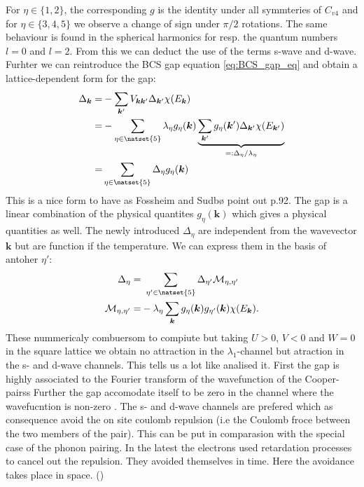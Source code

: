 \documentclass[../main.tex]{subfile}
\begin{document}
For $\eta \in \{1,2\}$, the corresponding $g$ is the identity under all symmteries of $C_{v4}$ and for $\eta \in \{3,4,5\}$ we observe a change of sign under  $\pi/2$ rotations.
The same behaviour is found in the spherical harmonics for resp. the quantum numbers $l=0$ and $l=2$. From this we can deduct the use of the terms s-wave and d-wave. \\ 

Furhter we can reintroduce the BCS gap equation \ref{eq:BCS_gap_eq} and obtain a lattice-dependent form for the gap:
\begin{equation}
    \begin{aligned}
    \Delta_{\bm{k}} =& -\sum_{\bm{k}'} V_{\bm{k}\bm{k}'}\Delta_{\bm{k}'}\chi(E_{\bm{k}})\\
    =& -\sum_{\eta\in\natset{5}} \lambda_{\eta} g_{\eta}(\bm{k}) \underbrace{\sum_{\bm{k}'} g_{\eta}(\bm{k}') \Delta_{\bm{k}'}\chi(E_{\bm{k}'})}_{=: \Delta_{\eta}/\lambda_{\eta}}\\
    =& \sum_{\eta\in\natset{5}}\Delta_{\eta} g_{\eta}(\bm{k})
    \end{aligned}
\end{equation}
This is a nice form to have as Fossheim and Sudbø \cite{FossheimSudbo2004} point out p.92. The gap is a linear combination of the physical quantites $g_{\eta}(\bm{k})$ which gives a physical 
quantities as well. The newly introduced $\Delta_{\eta}$ are independent from the wavevector $\bm{k}$ but are function if the temperature. We can express them in the basis 
of antoher $\eta'$:
\begin{align*}
    \Delta_{\eta} = &~\sum_{\eta' \in \natset{5}} \Delta_{\eta'} \mathcal{M}_{\eta,\eta'}\\
    \mathcal{M}_{\eta,\eta'} =& -\lambda_{\eta}\sum_{\bm{k}} g_{\eta}(\bm{k})g_{\eta'}(\bm{k}) \chi(E_{\bm{k}}).
\end{align*}
These nummericaly combuersom to compiute but taking $U>0$, $V<0$ and $W=0$ in the square lattice we obtain no attraction  in the 
$\lambda_1$-channel but atraction in the s- and d-wave channels. This tells us a lot like \cite{FossheimSudbo2004} analised it. 
First the gap is highly associated to the Fourier transform of the wavefunction of the Cooper-pairss     
Further the gap accomodate itself to be zero in the channel where the wavefucntion is non-zero .
The s- and d-wave channels are prefered which as consequence avoid the on site coulomb repulsion (i.e the Coulomb froce between the two members of the pair).
This can be put in comparasion with the special
case of the phonon pairing. In the latest the electrons used retardation processes to cancel out the repulsion. They avoided themselves in time. 
Here the avoidance takes place in space. ()\\
\end{document}
